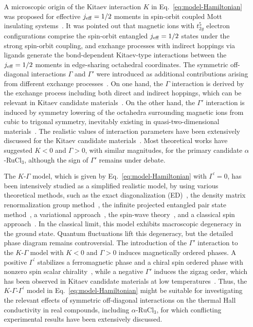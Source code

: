 \documentclass[twocolumn,superscriptaddress,showpacs, longbibliography, aps, prx]{revtex4-2}
\begin{document}
A microscopic origin of the Kitaev interaction $K$ in Eq.~\eqref{eq:model-Hamiltonian} was proposed for effective $j_{\rm eff}=1/2$ moments in spin-orbit coupled Mott insulating systems~\cite{Jackeli_PRL2009}. 
It was pointed out that magnetic ions with $t_{2g}^5$ electron configurations comprise the spin-orbit entangled $j_{\rm eff}=1/2$ states under the strong spin-orbit coupling, and exchange processes with indirect hoppings via ligands generate the bond-dependent Kitaev-type interactions between the $j_{\rm eff}=1/2$ moments in edge-sharing octahedral coordinates. 
The symmetric off-diagonal interactions $\Gamma$ and $\Gamma'$ were introduced as additional contributions arising from different exchange processes~\cite{Rau2014}. 
On one hand, the $\Gamma$ interaction is derived by the exchange process including both direct and indirect hoppings, which can be relevant in Kitaev candidate materials~\cite{Yamaji2014,Winter2016,WinterTDBSGV2017,OkuboSYKSTI2017}. 
On the other hand, the $\Gamma'$ interaction is induced by symmetry lowering of the octahedra surrounding magnetic ions from cubic to trigonal symmetry, inevitably existing in quasi-two-dimensional materials~\cite{Rau2014}.
The realistic values of interaction parameters have been extensively discussed for the Kitaev candidate materials~\cite{Yamaji2016,Suzuki2018,laurell2020dynamical,Maksimov2020}.
Most theoretical works have suggested $K<0$ and $\Gamma>0$, with similar magnitudes, for the primary candidate $\alpha$-RuCl$_3$, although the sign of $\Gamma'$ remains under debate.

The $K$-$\Gamma$ model, which is given by Eq.~\eqref{eq:model-Hamiltonian} with $\Gamma^\prime=0$, has been intensively studied as a simplified realistic model, by using various theoretical methods, such as the exact diagonalization (ED)~\cite{catuneanu2018,Yamada2020}, the density matrix renormalization group method~\cite{Gohlke_PRB2018}, the infinite projected entangled pair state method~\cite{Lee_NCom2020,ZhangLLLW2023}, a variational approach~\cite{Zhang2021}, the spin-wave theory~\cite{Smit2020}, and a classical spin approach~\cite{Rayyan2021}.
In the classical limit, this model exhibits macroscopic degeneracy in the ground state. 
Quantum fluctuations lift this degeneracy, but the detailed phase diagram remains controversial.
The introduction of the $\Gamma'$ interaction to the $K$-$\Gamma$ model with $K<0$ and $\Gamma>0$ induces magnetically ordered phases. 
A positive $\Gamma^\prime$ stabilizes a ferromagnetic phase and a chiral spin ordered phase with nonzero spin scalar chirality~\cite{Luo2022PRR,Luo2022}, 
while a negative $\Gamma'$ induces the zigzag order, which has been observed in Kitaev candidate materials at low temperatures~\cite{Rusna2019,gordon2019theory,Chern2020,Lee_NCom2020}. 
Thus, the $K$-$\Gamma$-$\Gamma^\prime$ model in Eq.~\eqref{eq:model-Hamiltonian} might be suitable for investigating the relevant effects of symmetric off-diagonal interactions on the thermal Hall conductivity in real compounds, including $\alpha$-$\mathrm{RuCl_3}$, for which conflicting experimental results have been extensively discussed.
\end{document}
